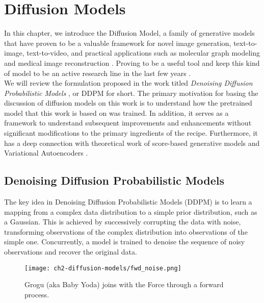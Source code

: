 \chapter{Diffusion Models}

In this chapter, we introduce the Diffusion Model, a family of generative models that have proven to be a valuable framework for novel image generation, text-to-image, text-to-video, and practical applications such as molecular graph modeling and medical image reconstruction \citep{sohldickstein2015deep, ramesh2021zeroshot,rombach2022highresolution,ho2020denoising,singer2022makeavideo,jing2023torsional,song2020denoising}. Proving to be a useful tool and keep this kind of model to be an active research line in the last few years \citep{yang2024diffusion}. \\

\noindent We will review the formulation proposed in the work titled \textit{Denoising Diffusion Probabilistic Models} \cite{ho2020denoising}, or DDPM for short. The primary motivation for basing the discussion of diffusion models on this work is to understand how the pretrained model that this work is based on was trained. In addition, it serves as a framework to understand subsequent improvements and enhancements without significant modifications to the primary ingredients of the recipe. Furthermore, it has a deep connection with theoretical work of score-based generative models \citep{song2020generative, song2020improved, song2021scorebased} and Variational Autoencoders \citep{luo2022understanding}.

\section{Denoising Diffusion Probabilistic Models}

The key idea in Denoising Diffusion Probabilistic Models (DDPM) is to learn a mapping from a complex data distribution to a simple prior distribution, such as a Gaussian. This is achieved by successively corrupting the data with noise, transforming observations of the complex distribution into observations of the simple one. Concurrently, a model is trained to denoise the sequence of noisy observations and recover the original data.\\

\begin{figure}[ht]
    \centering
    \texttt{[image: ch2-diffusion-models/fwd\_noise.png]}
    \captionsetup{width=\textwidth} %
    \caption{Grogu (aka Baby Yoda) joins with the Force through a forward process.}
    \label{fig:fwd-process-grogu}
\end{figure}
  
